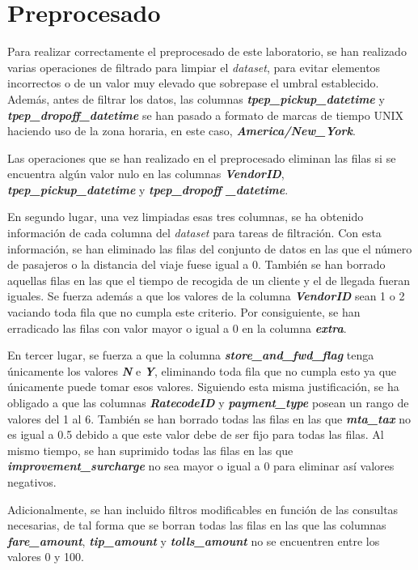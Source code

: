 \section{Preprocesado}

Para realizar correctamente el preprocesado de este laboratorio, se han realizado varias operaciones de filtrado para limpiar el \textit{dataset}, para evitar elementos incorrectos o de un valor muy elevado que sobrepase el umbral establecido. Además, antes de filtrar los datos, las columnas \textbf{\textit{tpep\_pickup\_datetime}} y \textbf{\textit{tpep\_dropoff\_datetime}} se han pasado a formato de marcas de tiempo UNIX haciendo uso de la zona horaria, en este caso, \textbf{\textit{America/New\_York}}.

Las operaciones que se han realizado en el preprocesado eliminan las filas si se encuentra algún valor nulo en las columnas \textbf{\textit{VendorID}}, \textbf{\textit{tpep\_pickup\_datetime}} y \textbf{\textit{tpep\_dropoff
\_datetime}}.

En segundo lugar, una vez limpiadas esas tres columnas, se ha obtenido información de cada columna del \textit{dataset} para tareas de filtración. Con esta información, se han eliminado las filas del conjunto de datos en las que el número de pasajeros o la distancia del viaje fuese igual a 0. También se han borrado aquellas filas en las que el tiempo de recogida de un cliente y el de llegada fueran iguales. Se fuerza además a que los valores de la columna \textbf{\textit{VendorID}} sean 1 o 2 vaciando toda fila que no cumpla este criterio. Por consiguiente, se han erradicado las filas con valor mayor o igual a 0 en la columna \textbf{\textit{extra}}.

En tercer lugar, se fuerza a que la columna \textbf{\textit{store\_and\_fwd\_flag}} tenga únicamente los valores \textbf{\textit{N}} e \textbf{\textit{Y}}, eliminando toda fila que no cumpla esto ya que únicamente puede tomar esos valores. Siguiendo esta misma justificación, se ha obligado a que las columnas \textbf{\textit{RatecodeID}} y \textbf{\textit{payment\_type}} posean un rango de valores del 1 al 6. También se han borrado todas las filas en las que \textbf{\textit{mta\_tax}} no es igual a 0.5 debido a que este valor debe de ser fijo para todas las filas. Al mismo tiempo, se han suprimido todas las filas en las que \textbf{\textit{improvement\_surcharge}} no sea mayor o igual a 0 para eliminar así valores negativos.

Adicionalmente, se han incluido filtros modificables en función de las consultas necesarias, de tal forma que se borran todas las filas en las que las columnas \textbf{\textit{fare\_amount}}, \textbf{\textit{tip\_amount}} y \textbf{\textit{tolls\_amount}} no se encuentren entre los valores 0 y 100.
